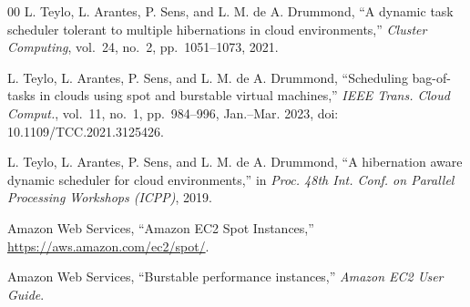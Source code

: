 \documentclass[conference]{IEEEtran}
\begin{document}
\begin{thebibliography}{00}
 L. Teylo, L. Arantes, P. Sens, and L. M. de A. Drummond,
``A dynamic task scheduler tolerant to multiple hibernations in cloud
environments,'' \emph{Cluster Computing}, vol.~24, no.~2, pp.~1051--1073, 2021.

 L. Teylo, L. Arantes, P. Sens, and L. M. de A. Drummond,
``Scheduling bag-of-tasks in clouds using spot and burstable virtual
machines,'' \emph{IEEE Trans. Cloud Comput.}, vol.~11, no.~1, pp.~984--996,
Jan.--Mar. 2023, doi: 10.1109/TCC.2021.3125426.

 L. Teylo, L. Arantes, P. Sens, and L. M. de A. Drummond,
``A hibernation aware dynamic scheduler for cloud environments,'' in
\emph{Proc. 48th Int. Conf. on Parallel Processing Workshops (ICPP)}, 2019.

 Amazon Web Services, ``Amazon EC2 Spot Instances,''
\url{https://aws.amazon.com/ec2/spot/}.

 Amazon Web Services, ``Burstable performance instances,''
\emph{Amazon EC2 User Guide}.

\end{thebibliography}
\end{document}
